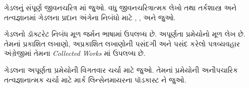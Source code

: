 \documentclass[../../../include/open-logic-section]{subfiles}
\begin{document}
\begin{reading}
ગેડલનું સંપૂર્ણ જીવનચરિત્ર
\citet{Dawson1997}માં જુઓ. વધુ જીવનચરિત્રાત્મક
લેખો તથા તર્કશાસ્ત્ર અને તત્વજ્ઞાનમાં
ગેડલના પ્રદાન અંગેના નિબંધો માટે
\citet{Wang1990}, \citet{Baaz2011},
\citet{Takeuti2003} અને \citet{Sigmund2007} જુઓ.

ગેડલનો ડૉક્ટરેટ નિબંધ મૂળ જર્મન
ભાષામાં \citep{Godel1929} ઉપલબ્ધ છે.
અપૂર્ણતા પ્રમેયોનો મૂળ લેખ
\citep{Godel1931} છે. તેમનાં
પ્રકાશિત લખાણો, અપ્રકાશિત લખાણોની
પસંદગી અને પસંદ કરેલો પત્રવ્યવહાર
અંગ્રેજીમાં તેમના
\emph{Collected Works}
\citet{Godel1986,Godel1990}માં ઉપલબ્ધ છે.

ગેડલના અપૂર્ણતા પ્રમેયોની
વિગતવાર ચર્ચા માટે
\citet{Smith2013} જુઓ.
તેમનાં પ્રમેયોની અનૌપચારિક
તત્વજ્ઞાનાત્મક ચર્ચા માટે
માર્ક લિન્સેનમાયરના પૉડકાસ્ટ
\citep{Linsenmayer2014}ને જુઓ.
\end{reading}
\end{document}
